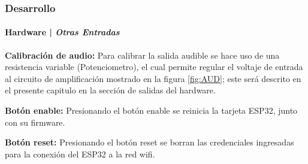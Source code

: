 \begin{frame}[t]
\frametitle{Desarrollo}
\framesubtitle{Hardware | \emph{Otras Entradas}}

	\textbf{Calibración de audio:}
		Para calibrar la salida audible se hace uso de una resistencia variable (Potenciometro), el cual permite regular el voltaje de entrada al circuito de amplificación mostrado en la figura \ref{fig:AUD}; este será descrito en el presente capitulo en la sección de salidas del hardware.\newline
		
	\textbf{Botón enable:}
		Presionando el botón enable se reinicia la tarjeta ESP32, junto con su firmware.\newline
		
	\textbf{Botón reset:}
		Presionando el botón reset se borran las credenciales ingresadas para la conexión del ESP32 a la red wifi.\newline

\end{frame}

